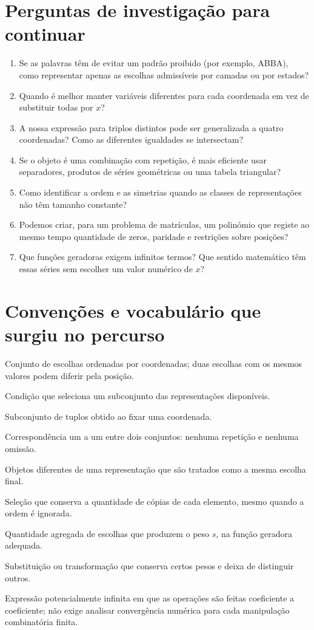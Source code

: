 \documentclass[11pt,a4paper,oneside]{book}
\newcommand{\rom}[1]{\textsc{#1}}
\begin{document}
\chapter{Perguntas de investigação para continuar}
\begin{enumerate}[leftmargin=*,itemsep=.65em]
\item Se as palavras têm de evitar um padrão proibido (por exemplo, \rom{ABBA}), como representar apenas as escolhas admissíveis por camadas ou por estados?
\item Quando é melhor manter variáveis diferentes para cada coordenada em vez de substituir todas por $x$?
\item A nossa expressão para triplos distintos pode ser generalizada a quatro coordenadas? Como as diferentes igualdades se intersectam?
\item Se o objeto é uma combinação com repetição, é mais eficiente usar separadores, produtos de séries geométricas ou uma tabela triangular?
\item Como identificar a ordem e as simetrias quando as classes de representações não têm tamanho constante?
\item Podemos criar, para um problema de matrículas, um polinómio que registe ao mesmo tempo quantidade de zeros, paridade e restrições sobre posições?
\item Que funções geradoras exigem infinitos termos? Que sentido matemático têm essas séries sem escolher um valor numérico de $x$?
\end{enumerate}
\chapter{Convenções e vocabulário que surgiu no percurso}
\begin{description}[style=nextline,leftmargin=1mm,labelwidth=0pt,itemsep=.5em]
\item[Produto cartesiano] Conjunto de escolhas ordenadas por coordenadas; duas escolhas com os mesmos valores podem diferir pela posição.
\item[Restrição] Condição que seleciona um subconjunto das representações disponíveis.
\item[Camada ou fibra] Subconjunto de tuplos obtido ao fixar uma coordenada.
\item[Bijeção] Correspondência um a um entre dois conjuntos: nenhuma repetição e nenhuma omissão.
\item[Representações equivalentes] Objetos diferentes de uma representação que são tratados como a mesma escolha final.
\item[Multiconjunto] Seleção que conserva a quantidade de cópias de cada elemento, mesmo quando a ordem é ignorada.
\item[Coeficiente de $x^s$] Quantidade agregada de escolhas que produzem o peso $s$, na função geradora adequada.
\item[Projeção de informação] Substituição ou transformação que conserva certos pesos e deixa de distinguir outros.
\item[Série formal] Expressão potencialmente infinita em que as operações são feitas coeficiente a coeficiente; não exige analisar convergência numérica para cada manipulação combinatória finita.
\end{description}
\end{document}
